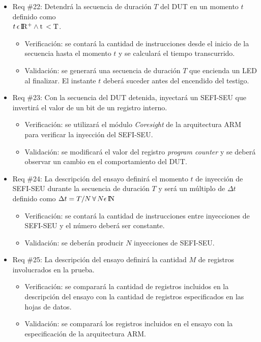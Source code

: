 \documentclass[
11pt, %
]{charter}
\begin{document}
\begin{itemize}
\item Req \#22: Detendrá la secuencia de duración $ T $ del DUT en un momento $ t $ definido como \\ $ t \, \epsilon \, \rm I\!R^+ \wedge t \, < T$.
\begin{itemize}
    \item Verificación: se contará la cantidad de instrucciones desde el inicio de la secuencia hasta el momento $ t $ y se calculará el tiempo transcurrido.
    \item Validación: se generará una secuencia de duración $ T $ que encienda un LED al finalizar. El instante $ t $ deberá suceder antes del encendido del testigo.
\end{itemize}

\item Req \#23: Con la secuencia del DUT detenida, inyectará un SEFI-SEU que invertirá el valor de un bit de un registro interno.
\begin{itemize}
    \item Verificación: se utilizará el módulo \emph{Coresight} de la arquitectura ARM para verificar la inyección del SEFI-SEU.
    \item Validación: se modificará el valor del registro \emph{program counter} y se deberá observar un cambio en el comportamiento del DUT.
\end{itemize}

\item Req \#24: La descripción del ensayo definirá el momento $ t $ de inyección de SEFI-SEU durante la secuencia de duración $ T $ y será un múltiplo de $\Delta t$ definido como $ \Delta t=T/N \, \forall \, N \epsilon \, \rm I\!N $
\begin{itemize}
    \item Verificación: se contará la cantidad de instrucciones entre inyecciones de SEFI-SEU y el número deberá ser constante.
    \item Validación: se deberán producir $ N $ inyecciones de SEFI-SEU.
\end{itemize}

\item Req \#25: La descripción del ensayo definirá la cantidad $ M $ de registros involucrados en la prueba.
\begin{itemize}
    \item Verificación: se comparará la cantidad de registros incluidos en la descripción del ensayo con la cantidad de registros especificados en las hojas de datos.
    \item Validación: se comparará los registros incluidos en el ensayo con la especificación de la arquitectura ARM.
\end{itemize}


\end{itemize}
\end{document}
